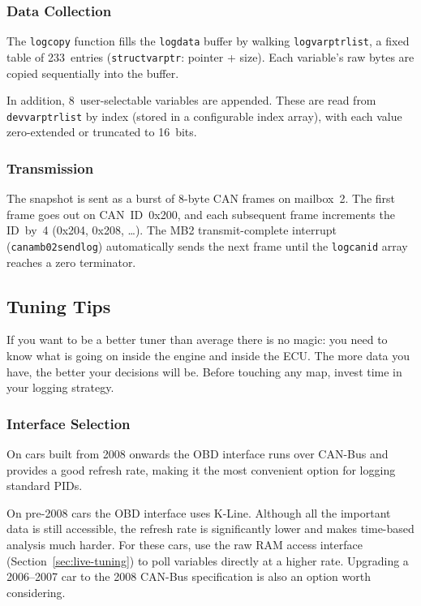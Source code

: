 \documentclass[a4paper,11pt]{article}
\renewcommand{\_}{\oldunderscore\allowbreak}
\begin{document}
\subsubsection*{Data Collection}

The \texttt{log\_copy} function fills the \texttt{log\_data} buffer by walking
\texttt{log\_varptr\_list}, a fixed table of 233~entries
(\texttt{struct\_varptr}: pointer + size). Each variable's raw bytes are copied
sequentially into the buffer.

In addition, 8~user-selectable variables are appended. These are read from
\texttt{dev\_varptr\_list} by index (stored in a configurable index array),
with each value zero-extended or truncated to 16~bits.

\subsubsection*{Transmission}

The snapshot is sent as a burst of 8-byte CAN frames on mailbox~2. The first
frame goes out on CAN~ID~0x200, and each subsequent frame increments the
ID~by~4 (0x204, 0x208, \ldots). The MB2 transmit-complete interrupt
(\texttt{can\_a\_mb02\_send\_log}) automatically sends the next frame until the
\texttt{log\_canid} array reaches a zero terminator.

\subsection{Tuning Tips}

If you want to be a better tuner than average there is no magic: you need to
know what is going on inside the engine and inside the ECU. The more data you
have, the better your decisions will be. Before touching any map, invest time
in your logging strategy.

\subsubsection*{Interface Selection}

On cars built from 2008 onwards the OBD interface runs over CAN-Bus and
provides a good refresh rate, making it the most convenient option for
logging standard PIDs.

On pre-2008 cars the OBD interface uses K-Line. Although all the important
data is still accessible, the refresh rate is significantly lower and makes
time-based analysis much harder. For these cars, use the raw RAM access
interface (Section~\ref{sec:live-tuning}) to poll variables directly at a
higher rate. Upgrading a 2006--2007 car to the 2008 CAN-Bus specification is
also an option worth considering.
\end{document}
